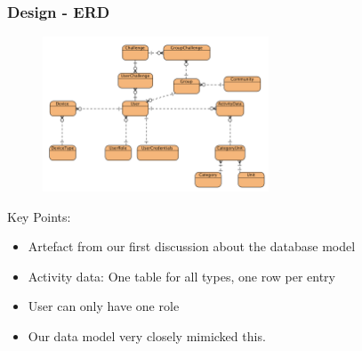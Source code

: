 \documentclass[10pt, compress]{beamer}
\begin{document}
\begin{frame}[fragile]
  \frametitle{Design - ERD}
  
  
    	   \begin{figure}
  \begin{center}
    \includegraphics[width=0.6\textwidth]{../design/database/GoAber-ERD.png}
  \end{center}
  \end{figure}
  
  	Key Points:
  
  	\begin{itemize}
		\item Artefact from our first discussion about the database model
	   	\item Activity data: One table for all types, one row per entry
	   	\item User can only have one role
	   	\item Our data model very closely mimicked this.
	\end{itemize}
     

\end{frame}


\end{document}
